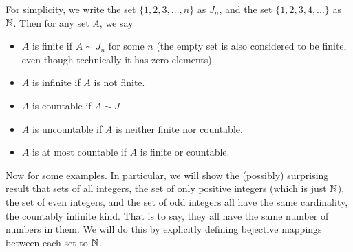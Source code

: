 \documentclass[../../templates/section]{subfiles}
\begin{document}
\begin{definition}
For simplicity, we write the set $\{1, 2, 3,\ldots, n\}$ as $J_n$, and
the set $\{1,2,3,4,...\}$ as $\mathbb{N}$. Then for any set $A$, we say
\begin{itemize}
    \item $A$ is finite if $A\sim J_n$ for some $n$ (the empty set is also considered to be 
finite, even though technically it has zero elements).
    \item $A$ is infinite if $A$ is not finite.
    \item $A$ is countable if $A\sim J$
    \item $A$ is uncountable if $A$ is neither finite nor countable.
    \item $A$ is at most countable if $A$ is finite or countable.
\end{itemize}
\end{definition}

Now for some examples. In particular, we will show the (possibly) surprising result 
that sets of all integers, the set of only positive integers (which is just 
$\mathbb{N}$), the set of even integers, and the set of odd integers all have the 
same cardinality, the countably infinite kind. 
That is to say, they all have the same number of numbers in them. 
We will do this by explicitly defining bejective mappings between each set to 
$\mathbb{N}$.
\end{document}
